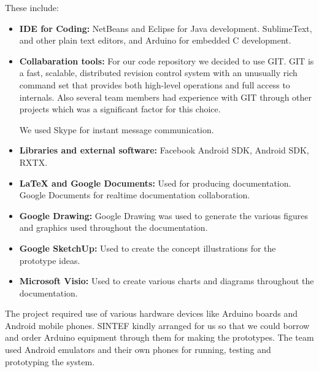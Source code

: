 These include:\newline
\begin{itemize}
	\item \textbf{IDE for Coding:} \newline
	NetBeans\cite{link:netbeans} and Eclipse\cite{link:eclipse} for Java development. SublimeText\cite{link:sublimetext}, and other plain text editors, and Arduino\cite{link:arduinodev} for embedded C development.

	\item \textbf{Collabaration tools:} \newline
	For our code repository we decided to use GIT\cite{link:git}. GIT is a fast, scalable, distributed revision control system 
	with an unusually rich command set that provides both high-level operations and full access to internals. Also 
	several team members had experience with GIT through other projects which was a significant factor for 
	this choice.

	We used Skype\cite{link:skype} for instant message communication.

	\item \textbf{Libraries and external software:} \newline
	 Facebook Android SDK\cite{link:facebooksdk}, Android SDK\cite{link:androidsdk}, RXTX\cite{link:rxtx}.

	\item \textbf{\LaTeX{} and Google Documents:} \newline
	Used for producing documentation. Google Documents\cite{link:googledocs} for realtime documentation collaboration.

	\item \textbf{Google Drawing:} \newline
	Google Drawing\cite{link:googledocs} was used to generate the various figures and graphics used throughout the documentation.

	\item \textbf{Google SketchUp:} \newline
	Used to create the concept illustrations for the prototype ideas.\cite{link:googlesketchup}

	\item \textbf{Microsoft Visio:} \newline
	Used to create various charts and diagrams throughout the documentation.\cite{link:visio}

\end{itemize}

The project required use of various hardware devices like Arduino boards and Android mobile phones.
SINTEF kindly arranged for us so that we could borrow and order Arduino equipment through them for making the prototypes.
The team used Android emulators and their own phones for running, testing and prototyping the system.

